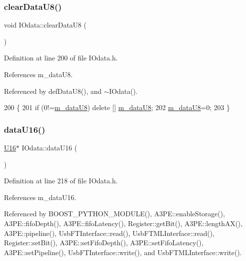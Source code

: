 \subsubsection{\texorpdfstring{clear\+Data\+U8()}{clearDataU8()}}
{\footnotesize\ttfamily void I\+Odata\+::clear\+Data\+U8 (\begin{DoxyParamCaption}{ }\end{DoxyParamCaption})\hspace{0.3cm}{\ttfamily [inline]}}



Definition at line 200 of file I\+Odata.\+h.



References m\+\_\+data\+U8.



Referenced by def\+Data\+U8(), and $\sim$\+I\+Odata().


\begin{DoxyCode}
200                     \{
201     \textcolor{keywordflow}{if} (0!=\hyperlink{classIOdata_a9c4c0dc5104f7f3b170e30ab78fe61e7}{m\_dataU8}) \textcolor{keyword}{delete} [] \hyperlink{classIOdata_a9c4c0dc5104f7f3b170e30ab78fe61e7}{m\_dataU8};
202     \hyperlink{classIOdata_a9c4c0dc5104f7f3b170e30ab78fe61e7}{m\_dataU8}=0;
203   \}
\end{DoxyCode}
\mbox{\label{classIOdata_a8d8528b731c6cf117f8c5b9b2473390c}} 
\subsubsection{\texorpdfstring{data\+U16()}{dataU16()}\hspace{0.1cm}{\footnotesize\ttfamily [1/2]}}
{\footnotesize\ttfamily \hyperlink{classIOdata_a1eb45b348534a7c19a4a99b746e693ff}{U16}$\ast$ I\+Odata\+::data\+U16 (\begin{DoxyParamCaption}{ }\end{DoxyParamCaption})\hspace{0.3cm}{\ttfamily [inline]}}



Definition at line 218 of file I\+Odata.\+h.



References m\+\_\+data\+U16.



Referenced by B\+O\+O\+S\+T\+\_\+\+P\+Y\+T\+H\+O\+N\+\_\+\+M\+O\+D\+U\+L\+E(), A3\+P\+E\+::enable\+Storage(), A3\+P\+E\+::fifo\+Depth(), A3\+P\+E\+::fifo\+Latency(), Register\+::get\+Bit(), A3\+P\+E\+::length\+A\+X(), A3\+P\+E\+::pipeline(), Usb\+F\+T\+Interface\+::read(), Usb\+F\+T\+M\+L\+Interface\+::read(), Register\+::set\+Bit(), A3\+P\+E\+::set\+Fifo\+Depth(), A3\+P\+E\+::set\+Fifo\+Latency(), A3\+P\+E\+::set\+Pipeline(), Usb\+F\+T\+Interface\+::write(), and Usb\+F\+T\+M\+L\+Interface\+::write().


